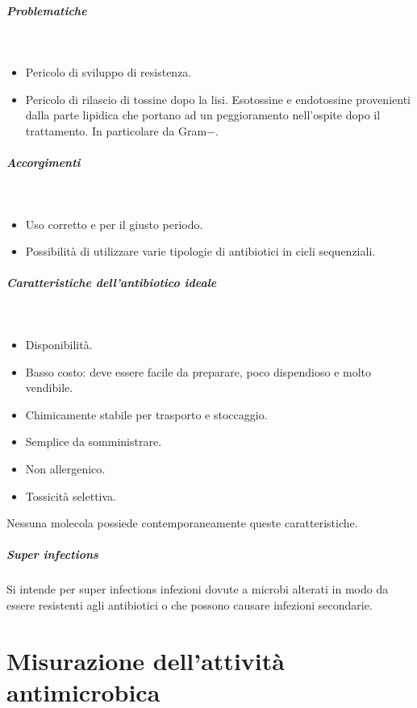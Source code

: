 				\subparagraph{Problematiche}\mbox{}\\
				\begin{multicols}{2}
					\begin{itemize}
    						\item Pericolo di sviluppo di resistenza.
    						\item Pericolo di rilascio di tossine dopo la lisi. 
							Esotossine e endotossine provenienti dalla parte lipidica che portano ad un peggioramento nell'ospite dopo il trattamento.
							In particolare da Gram$-$.
					\end{itemize}
				\end{multicols}

				\subparagraph{Accorgimenti}\mbox{}\\
				\begin{multicols}{2}
					\begin{itemize}
						\item Uso corretto e per il giusto periodo.
    						\item Possibilità di utilizzare varie tipologie di antibiotici in cicli sequenziali.
					\end{itemize}
				\end{multicols}

				\subparagraph{Caratteristiche dell'antibiotico ideale}\mbox{}\\
				\begin{multicols}{2}
					\begin{itemize}
    						\item Disponibilità.
    						\item Basso costo: deve essere facile da preparare, poco dispendioso e molto vendibile.
    						\item Chimicamente stabile per trasporto e stoccaggio.
    						\item Semplice da somministrare.
    						\item Non allergenico.
    						\item Tossicità selettiva.
					\end{itemize}
				\end{multicols}
				Nessuna molecola possiede contemporaneamente queste caratteristiche.

				\subparagraph{Super infections}
				Si intende per super infections infezioni dovute a microbi alterati in modo da essere resistenti agli antibiotici o che possono causare infezioni secondarie.

\section{Misurazione dell'attività antimicrobica}

